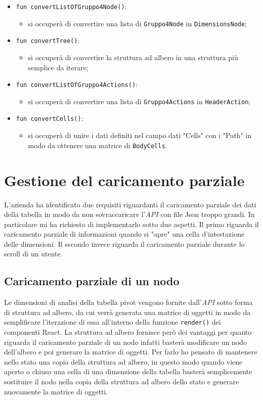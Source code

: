 \begin{itemize}
	\item \verb|fun convertListOfGruppo4Node()|:
	\begin{itemize}
		\item si occuperà di convertire una lista di \verb|Gruppo4Node| in \verb|DimensionsNode|;
	\end{itemize}

	\item \verb|fun convertTree()|:
	\begin{itemize}
		\item si occuperà di convertire la struttura ad albero in una struttura più semplice da iterare;
	\end{itemize}
	
	\item \verb|fun convertListOfGruppo4Actions()|:
	\begin{itemize}
		\item si occuperà di convertire una lista di \verb|Gruppo4Actions| in \verb|HeaderAction|;
	\end{itemize}

	\item \verb|fun convertCells()|:
	\begin{itemize}
		\item si occuperà di unire i dati definiti nel campo dati "Cells" con i "Path" in modo da ottenere una matrice di \verb|BodyCells|.
	\end{itemize}
\end{itemize}

\section{Gestione del caricamento parziale}
L'azienda ha identificato due requisiti riguardanti il caricamento parziale dei dati della tabella in modo da non sovraccaricare l'\emph{API} con file Json troppo grandi. In particolare mi ha richiesto di implementarlo sotto due aspetti. Il primo riguarda il caricamento parziale di informazioni quando si "apre" una cella d'intestazione delle dimensioni. Il secondo invece riguarda il caricamento parziale durante lo scroll di un utente.

\subsection*{Caricamento parziale di un nodo}
Le dimensioni di analisi della tabella pivot vengono fornite dall'\emph{API} sotto forma di struttura ad albero, da cui verrà generata una matrice di oggetti in modo da semplificare l'iterazione di essa all'interno della funzione \verb|render()| dei componenti React. La struttura ad albero fornisce però dei vantaggi per quanto riguarda il caricamento parziale di un nodo infatti basterà modificare un nodo dell'albero e poi generare la matrice di oggetti. Per farlo ho pensato di mantenere nello stato una copia della struttura ad albero, in questo modo quando viene aperto o chiuso una cella di una dimensione della tabella basterà semplicemente sostituire il nodo nella copia della struttura ad albero dello stato e generare nuovamente la matrice di oggetti.

